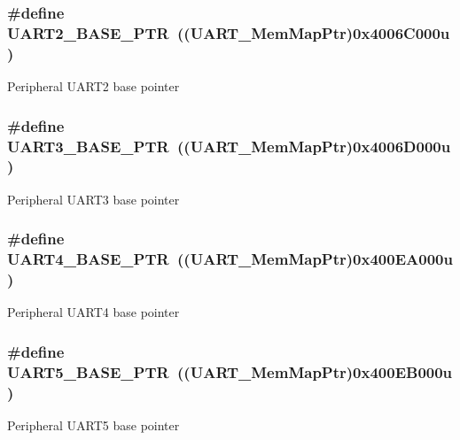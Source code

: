 \subsubsection[{U\+A\+R\+T2\+\_\+\+B\+A\+S\+E\+\_\+\+P\+T\+R}]{\setlength{\rightskip}{0pt plus 5cm}\#define U\+A\+R\+T2\+\_\+\+B\+A\+S\+E\+\_\+\+P\+T\+R~(({\bf U\+A\+R\+T\+\_\+\+Mem\+Map\+Ptr})0x4006\+C000u)}\label{group___u_a_r_t___peripheral_ga75ca2ea4e490b3c1c7aa55fc9c25cd37}
Peripheral U\+A\+R\+T2 base pointer \hypertarget{group___u_a_r_t___peripheral_gadf42d0466618b9209401839e1af9b3c4}{}
\subsubsection[{U\+A\+R\+T3\+\_\+\+B\+A\+S\+E\+\_\+\+P\+T\+R}]{\setlength{\rightskip}{0pt plus 5cm}\#define U\+A\+R\+T3\+\_\+\+B\+A\+S\+E\+\_\+\+P\+T\+R~(({\bf U\+A\+R\+T\+\_\+\+Mem\+Map\+Ptr})0x4006\+D000u)}\label{group___u_a_r_t___peripheral_gadf42d0466618b9209401839e1af9b3c4}
Peripheral U\+A\+R\+T3 base pointer \hypertarget{group___u_a_r_t___peripheral_ga680f97e081544c697ee071702b2de587}{}
\subsubsection[{U\+A\+R\+T4\+\_\+\+B\+A\+S\+E\+\_\+\+P\+T\+R}]{\setlength{\rightskip}{0pt plus 5cm}\#define U\+A\+R\+T4\+\_\+\+B\+A\+S\+E\+\_\+\+P\+T\+R~(({\bf U\+A\+R\+T\+\_\+\+Mem\+Map\+Ptr})0x400\+E\+A000u)}\label{group___u_a_r_t___peripheral_ga680f97e081544c697ee071702b2de587}
Peripheral U\+A\+R\+T4 base pointer \hypertarget{group___u_a_r_t___peripheral_gace0110558cde93abab79b033e3caf755}{}
\subsubsection[{U\+A\+R\+T5\+\_\+\+B\+A\+S\+E\+\_\+\+P\+T\+R}]{\setlength{\rightskip}{0pt plus 5cm}\#define U\+A\+R\+T5\+\_\+\+B\+A\+S\+E\+\_\+\+P\+T\+R~(({\bf U\+A\+R\+T\+\_\+\+Mem\+Map\+Ptr})0x400\+E\+B000u)}\label{group___u_a_r_t___peripheral_gace0110558cde93abab79b033e3caf755}
Peripheral U\+A\+R\+T5 base pointer \hypertarget{group___u_a_r_t___peripheral_ga7b34a38b9492a1e1007b2f66383aef17}{}
